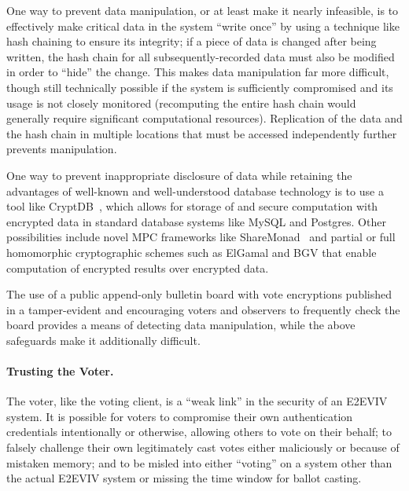 One way to prevent data manipulation, or at least make it nearly
infeasible, is to effectively make critical data in the system ``write
once'' by using a technique like hash chaining to ensure its
integrity; if a piece of data is changed after being written, the hash
chain for all subsequently-recorded data must also be modified in
order to ``hide'' the change. This makes data manipulation far more
difficult, though still technically possible if the system is
sufficiently compromised and its usage is not closely monitored
(recomputing the entire hash chain would generally require significant
computational resources). Replication of the data and the hash chain
in multiple locations that must be accessed independently further prevents manipulation. 

One way to prevent inappropriate disclosure of data while retaining
the advantages of well-known and well-understood database technology
is to use a tool like CryptDB~\cite{Popa11}, which allows for storage
of and secure computation with encrypted data in standard database
systems like MySQL and Postgres. Other possibilities include novel MPC
frameworks like ShareMonad~\cite{Launchbury14} and partial or full
homomorphic cryptographic schemes such as ElGamal and BGV that enable
computation of encrypted results over encrypted data.

The use of a public append-only bulletin board with vote encryptions published in a tamper-evident and encouraging voters and observers to frequently check the board provides a means of detecting data manipulation, while the above safeguards make it additionally difficult. 

\paragraph{Trusting the Voter.} The voter, like the voting client, is
a ``weak link'' in the security of an E2EVIV system. It is possible
for voters to compromise their own authentication credentials
intentionally or otherwise, allowing others to vote on their behalf;
to falsely challenge their own legitimately cast votes either
maliciously or because of mistaken memory; and to be misled into
either ``voting'' on a system other than the actual E2EVIV system or
missing the time window for ballot casting.

